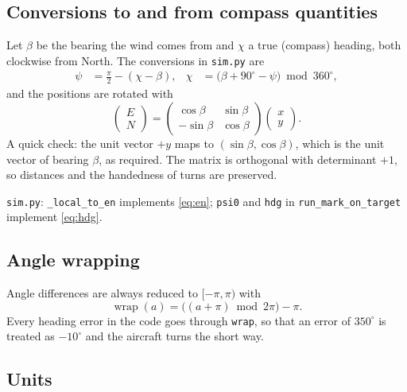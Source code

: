\documentclass[11pt,a4paper]{article}
\newcommand{\code}[1]{\texttt{#1}}
\newcommand{\wrap}{\operatorname{wrap}}
\begin{document}
\subsection{Conversions to and from compass quantities}

Let $\beta$ be the bearing the wind comes from and $\chi$ a true (compass)
heading, both clockwise from North. The conversions in \code{sim.py} are
\begin{align}
\psi &= \frac{\pi}{2} - (\chi - \beta), &
\chi &= \bigl(\beta + 90^\circ - \psi\bigr) \bmod 360^\circ, \label{eq:hdg}
\end{align}
and the positions are rotated with
\begin{equation}
\begin{pmatrix} E \\ N \end{pmatrix} =
\begin{pmatrix} \cos\beta & \sin\beta \\ -\sin\beta & \cos\beta \end{pmatrix}
\begin{pmatrix} x \\ y \end{pmatrix}. \label{eq:en}
\end{equation}
A quick check: the unit vector $+y$ maps to $(\sin\beta,\cos\beta)$, which is
the unit vector of bearing $\beta$, as required. The matrix is orthogonal with
determinant $+1$, so distances and the handedness of turns are preserved.

\begin{codemap}
\code{sim.py}: \code{\_local\_to\_en} implements \eqref{eq:en}; \code{psi0} and
\code{hdg} in \code{run\_mark\_on\_target} implement \eqref{eq:hdg}.
\end{codemap}

\subsection{Angle wrapping}

Angle differences are always reduced to $[-\pi,\pi)$ with
\begin{equation}
\wrap(a) = \bigl((a+\pi) \bmod 2\pi\bigr) - \pi .
\end{equation}
Every heading error in the code goes through \code{wrap}, so that an error of
$350^\circ$ is treated as $-10^\circ$ and the aircraft turns the short way.

\subsection{Units}
\end{document}
